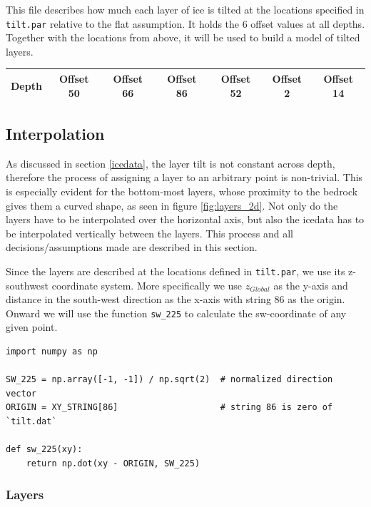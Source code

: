 \documentclass[a4paper,10pt]{scrartcl}
\begin{document}
This file describes how much each layer of ice is tilted at the locations specified in \texttt{tilt.par} relative to the flat assumption.
It holds the 6 offset values at all depths.
Together with the locations from above, it will be used to build a model of tilted layers.

\begin{center}
    \begin{tabular}{ |c||c|c|c|c|c|c| }
        \hline
        Depth & Offset 50 & Offset 66 & Offset 86 & Offset 52 & Offset 2 & Offset 14 \\
        \hline
    \end{tabular}
\end{center}

\subsection{Interpolation}
\label{interpolation}

As discussed in section \ref{icedata}, the layer tilt is not constant across depth, therefore the process of assigning a layer to an arbitrary point is non-trivial.
This is especially evident for the bottom-most layers, whose proximity to the bedrock gives them a curved shape, as seen in figure \ref{fig:layers_2d}.
Not only do the layers have to be interpolated over the horizontal axis, but also the icedata has to be interpolated vertically between the layers.
This process and all decisions/assumptions made are described in this section.

Since the layers are described at the locations defined in \texttt{tilt.par}, we use its z-southwest coordinate system.
More specifically we use $z_{Global}$ as the y-axis and distance in the south-west direction as the x-axis with string 86 as the origin.
Onward we will use the function \texttt{sw\_225} to calculate the sw-coordinate of any given point.

\begin{verbatim}
import numpy as np

SW_225 = np.array([-1, -1]) / np.sqrt(2)  # normalized direction vector
ORIGIN = XY_STRING[86]                    # string 86 is zero of `tilt.dat`

def sw_225(xy):
    return np.dot(xy - ORIGIN, SW_225)
\end{verbatim}

\subsubsection{Layers}
\end{document}

